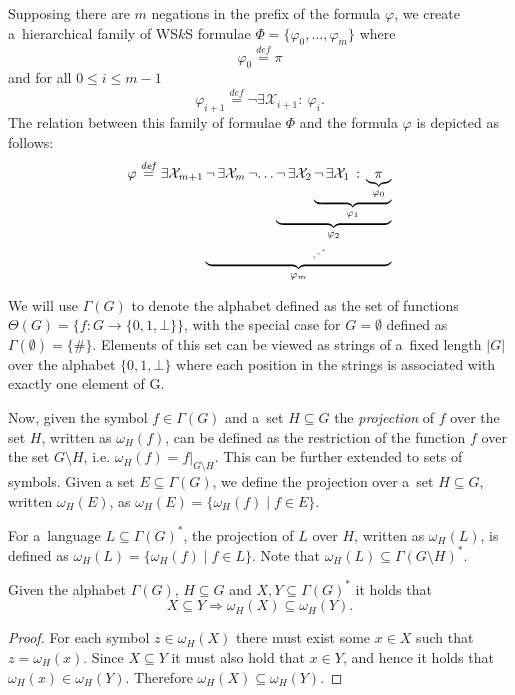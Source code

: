 Supposing there are $m$	negations in the prefix of the formula $\varphi$, we
create a~hierarchical family of WS$k$S formulae $\Phi = \{\varphi_0,\ldots,\varphi_m\}$
where
\begin{equation}
  \varphi_0 \overset{\mathit{def}}{=} \pi
\end{equation}
and for all $0 \leq i \leq m \minus 1$
\begin{equation}
 \varphi_{i+1} \overset{\mathit{def}}{=} \neg\exists\mathcal{X}_{i+1}:\ 
 \varphi_i.
\end{equation}
The relation between this family of formulae $\Phi$ and the formula $\varphi$ is
depicted as follows:
\begin{equation}
\begin{aligned}
\varphi \overset{\mathit{def}}{=} \exists \mathcal{X}_{m+1}\,
\underset{\varphi_m}{\underbrace{
  \neg\,\exists \mathcal{X}_m\,
  \neg
  \underset{\hspace{-3mm}\iddots}{
    \dots 
    \underset{\varphi_2}{\underbrace{
      \neg \,\exists \mathcal{X}_2\,
      \underset{\varphi_1}{\underbrace{
        \neg \,\exists \mathcal{X}_1\,:\,
        \underset{\varphi_0}{\underbrace{
          \pi
        }}
      }}
    }}
  }
}}
\end{aligned}
\end{equation}

We will use $\Gamma(G)$ to denote the alphabet defined as the
set of functions $\Theta(G) = \{f : G \rightarrow \{0, 1, \bot\}\}$, with the
special case for $G = \emptyset$ defined as $\Gamma(\emptyset) = \{\#\}$. Elements of this set can
be viewed as strings of a~fixed length $|G|$ over the alphabet $\{0, 1, \bot\}$
where each position in the strings is associated with exactly one element of G.

Now, given the symbol $f \in \Gamma(G)$ and a~set $H \subseteq G$ the
\emph{projection} of $f$ over the set $H$, written as $\omega_H(f)$, can be
defined as the restriction of the function $f$ over the set $G\setminus H$, i.e.
$\omega_H(f) = f|_{G\setminus H}$. This can be further extended to sets of symbols. Given a
set $E \subseteq \Gamma(G)$, we define the projection over a~set $H \subseteq
G$, written $\omega_H(E)$, as $\omega_H(E) = \{\omega_H(f) \mid f \in E\}$.

For a~language $L \subseteq \Gamma(G)^*$, the projection of $L$ over $H$,
written as $\omega_H(L)$, is defined as $\omega_H(L) = \{\omega_H(f) \mid f \in
L\}$. Note that $\omega_H(L) \subseteq \Gamma(G\setminus H)^*$.
\newpage
\begin{lemma} Given the alphabet $\Gamma(G)$, $H \subseteq G$ and $X, Y
\subseteq \Gamma(G)^*$ it holds that
\begin{equation}
 X \subseteq Y \Longrightarrow \omega_H(X) \subseteq \omega_H(Y).
\end{equation}
\end{lemma}
\begin{proof}
For each symbol $z \in \omega_H(X)$ there must exist some $x \in X$ such that
$z = \omega_H(x)$. Since $X \subseteq Y$ it must also hold that $x \in Y$, and
hence it holds that $\omega_H(x) \in \omega_H(Y)$. Therefore $\omega_H(X)
\subseteq \omega_H(Y)$.
\end{proof}

